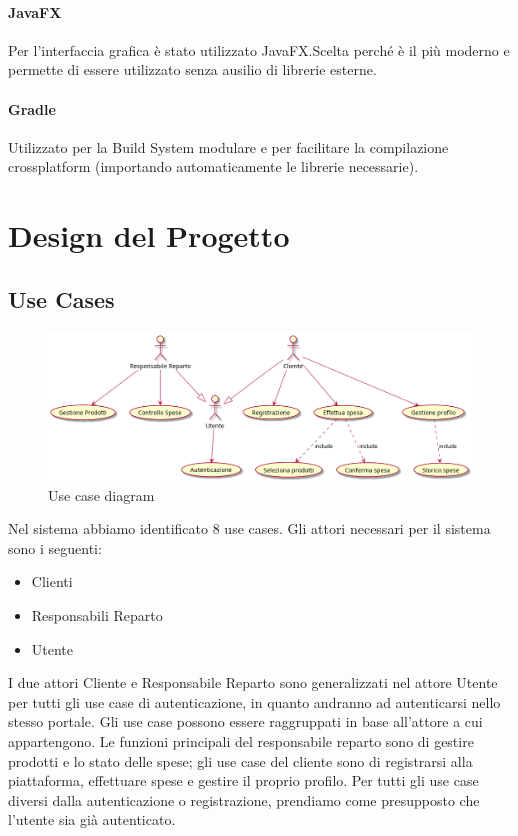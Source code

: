 \documentclass[12pt, a4paper]{report}
\begin{document}
\subsubsection{JavaFX}

Per l'interfaccia grafica è stato utilizzato JavaFX.\@ Scelta perché è il più 
moderno e permette di essere utilizzato senza ausilio di librerie esterne.

\subsubsection{Gradle}
Utilizzato per la Build System modulare e per facilitare la compilazione
crossplatform (importando automaticamente le librerie necessarie).

\chapter{Design del Progetto}

\section{Use Cases}

\begin{figure}[h]
  \centering
  \includegraphics[width=\textwidth]{use_case_diagram.png}
  \caption{Use case diagram}
\end{figure}

Nel sistema abbiamo identificato 8 use cases. Gli attori necessari per il 
sistema sono i seguenti:

\begin{itemize}
  \item Clienti
  \item Responsabili Reparto
  \item Utente
\end{itemize}

I due attori Cliente e Responsabile Reparto sono generalizzati nel attore
Utente per tutti gli use case di autenticazione, in quanto andranno ad
autenticarsi nello stesso portale. Gli use case possono essere raggruppati in
base all'attore a cui appartengono. Le funzioni principali del responsabile
reparto sono di gestire prodotti e lo stato delle spese; gli use case del
cliente sono di registrarsi alla piattaforma, effettuare spese e gestire il
proprio profilo. Per tutti gli use case diversi dalla autenticazione o
registrazione, prendiamo come presupposto che l'utente sia già autenticato.
\end{document}
